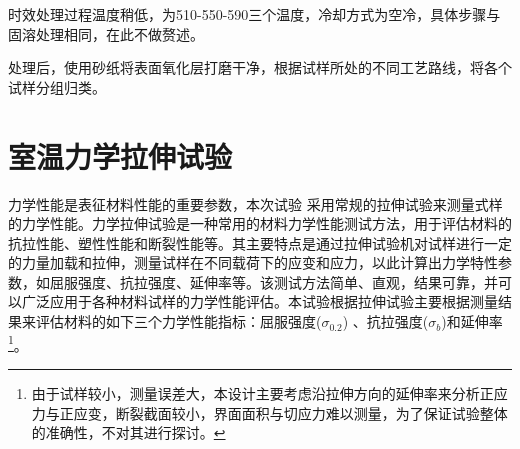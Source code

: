 时效处理过程温度稍低，为{510-550-590}三个温度，冷却方式为空冷，具体步骤与固溶处理相同，在此不做赘述。

处理后，使用砂纸将表面氧化层打磨干净，根据试样所处的不同工艺路线，将各个试样分组归类。


\section{室温力学拉伸试验}
力学性能是表征材料性能的重要参数，本次试验%
采用常规的拉伸试验来测量式样的力学性能。力学拉伸试验是一种常用的材料力学性能测试方法，用于评估材料的抗拉性能、塑性性能和断裂性能等。其主要特点是通过拉伸试验机对试样进行一定的力量加载和拉伸，测量试样在不同载荷下的应变和应力，以此计算出力学特性参数，如屈服强度、抗拉强度、延伸率等。该测试方法简单、直观，结果可靠，并可以广泛应用于各种材料试样的力学性能评估。本试验根据拉伸试验主要根据测量结果来评估材料的如下三个力学性能指标：屈服强度($ \sigma_{0.2} $) 、抗拉强度($ \sigma_b $)和延伸率\footnote{由于试样较小，测量误差大，本设计主要考虑沿拉伸方向的延伸率来分析正应力与正应变，断裂截面较小，界面面积与切应力难以测量，为了保证试验整体的准确性，不对其进行探讨。}。

